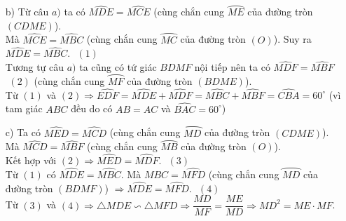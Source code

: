 \begin{ex}
{{\begin{tikzpicture}[scale=1.2]
\end{tikzpicture}
} \begin{enumerate}
                	\item [b)] 
                	Từ câu $a)$ ta có $\widehat{MDE}=\widehat{MCE}$ (cùng chắn cung $\wideparen{ME}$ của đường tròn $(CDME)$).\\
                	Mà $\widehat{MCE}=\widehat{MBC}$  (cùng chắn cung $\wideparen{MC}$ của đường tròn $(O)$). Suy ra $\widehat{MDE}=\widehat{MBC}$. $\,\,(1)$\\
                	Tương tự câu $a)$ ta cũng có tứ giác $BDMF$ nội tiếp nên ta có  $\widehat{MDF}=\widehat{MBF}$ $\,\,(2)$ (cùng chắn cung $\wideparen{MF}$ của đường tròn $(BDME)$).\\
                	Từ $(1)$ và $(2)\Rightarrow \widehat{EDF}=\widehat{MDE}+\widehat{MDF}=\widehat{MBC}+\widehat{MBF}=\widehat{CBA}=60^\circ$ (vì tam giác $ABC$ đều do có $AB=AC$ và $\widehat{BAC}=60^\circ$)
                	\item [c)] Ta có $\widehat{MED}=\widehat{MCD}$ (cùng chắn cung $\wideparen{MD}$ của đường tròn $(CDME)$).\\
                	Mà $\widehat{MCD}=\widehat{MBF}$ (cùng chắn cung $\wideparen{MB}$ của đường tròn $(O)$).\\
                	Kết hợp với $(2)\Rightarrow \widehat{MED}=\widehat{MDF}$. $\,\,(3)$\\
                	Từ $(1)$ có $\widehat{MDE}=\widehat{MBC}$. Mà $\widehat{MBC}=\widehat{MFD}$ (cùng chắn cung $\wideparen{MD}$ của đường tròn $(BDMF)$) $\Rightarrow \widehat{MDE}=\widehat{MFD}$. $\,\,(4)$\\
                	Từ $(3)$ và $(4)\Rightarrow \triangle MDE \backsim \triangle MFD \Rightarrow \dfrac{MD}{MF}=\dfrac{ME}{MD}\Rightarrow MD^2=ME\cdot MF$.
                	
          \end{enumerate}
	}
\end{ex}
